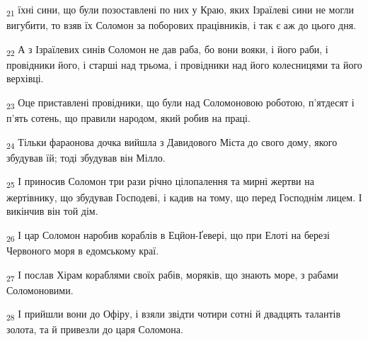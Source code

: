 \begin{tcolorbox}
\textsubscript{21} їхні сини, що були позоставлені по них у Краю, яких Ізраїлеві сини не могли вигубити, то взяв їх Соломон за поборових працівників, і так є аж до цього дня.
\end{tcolorbox}
\begin{tcolorbox}
\textsubscript{22} А з Ізраїлевих синів Соломон не дав раба, бо вони вояки, і його раби, і провідники його, і старші над трьома, і провідники над його колесницями та його верхівці.
\end{tcolorbox}
\begin{tcolorbox}
\textsubscript{23} Оце приставлені провідники, що були над Соломоновою роботою, п'ятдесят і п'ять сотень, що правили народом, який робив на праці.
\end{tcolorbox}
\begin{tcolorbox}
\textsubscript{24} Тільки фараонова дочка вийшла з Давидового Міста до свого дому, якого збудував їй; тоді збудував він Мілло.
\end{tcolorbox}
\begin{tcolorbox}
\textsubscript{25} І приносив Соломон три рази річно цілопалення та мирні жертви на жертівнику, що збудував Господеві, і кадив на тому, що перед Господнім лицем. І викінчив він той дім.
\end{tcolorbox}
\begin{tcolorbox}
\textsubscript{26} І цар Соломон наробив кораблів в Ецйон-Ґевері, що при Елоті на березі Червоного моря в едомському краї.
\end{tcolorbox}
\begin{tcolorbox}
\textsubscript{27} І послав Хірам кораблями своїх рабів, моряків, що знають море, з рабами Соломоновими.
\end{tcolorbox}
\begin{tcolorbox}
\textsubscript{28} І прийшли вони до Офіру, і взяли звідти чотири сотні й двадцять талантів золота, та й привезли до царя Соломона.
\end{tcolorbox}
